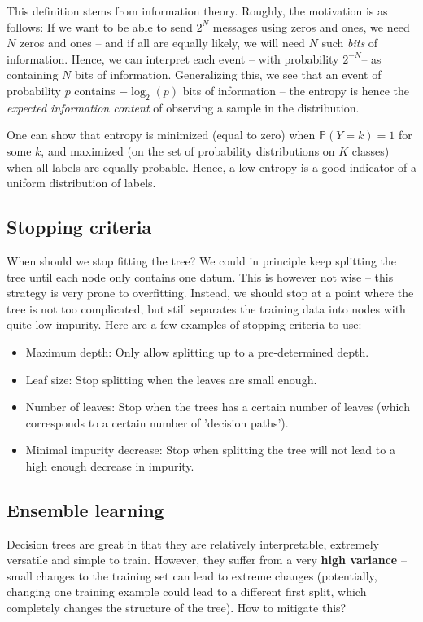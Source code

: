 \documentclass{article}
\begin{document}
This definition stems from information theory. Roughly, the motivation is as follows: If we want to be able to send $2^N$ messages using zeros and ones, we need $N$ zeros and ones -- and if all are equally likely, we will need $N$ such \emph{bits} of information. Hence, we can interpret each event -- with probability $2^{-N}$-- as containing $N$ bits of information. Generalizing this, we see that an event of probability $p$ contains $-\log_2(p)$ bits of information -- the entropy is hence the \emph{expected information content} of observing a sample in the distribution.


One can show that entropy is minimized (equal to zero) when $\mathbb{P}(Y=k)=1$ for some $k$, and maximized (on the set of probability distributions on $K$ classes) when all labels are equally probable. Hence, a low entropy is a good indicator of a uniform distribution of labels.

\subsection{Stopping criteria}
When should we stop fitting the tree? We could in principle keep splitting the tree until each node only contains one datum. This is however not wise -- this strategy is very prone to overfitting. Instead, we should stop at a point where the tree is not too complicated, but still separates the training data into nodes with quite low impurity. Here are a few examples of stopping criteria to use:
\begin{itemize}
    \item Maximum depth: Only allow splitting up to a pre-determined depth.
    \item Leaf size: Stop splitting when the leaves are small enough.
    \item Number of leaves: Stop when the trees has a certain number of leaves (which corresponds to a certain number of 'decision paths').
    \item Minimal impurity decrease: Stop when splitting the tree will not lead to a high enough decrease in impurity.
\end{itemize}

\subsection{Ensemble learning}
Decision trees are great in that they are relatively interpretable, extremely versatile and simple to train. However, they suffer from a very \textbf{high variance} -- small changes to the training set can lead to extreme changes (potentially, changing one training example could lead to a different first split, which completely changes the structure of the tree). How to mitigate this?
\end{document}
